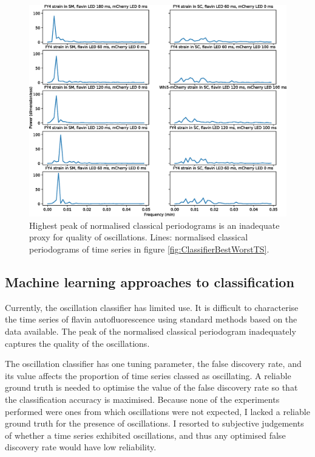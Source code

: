\begin{figure}[htbp]
  \centering
  \includegraphics[width=\textwidth]{10m_ClassifierBestWorstPS}
  \caption{Highest peak of normalised classical periodograms is an inadequate proxy for quality of oscillations.
    Lines: normalised classical periodograms of time series in figure \ref{fig:ClassifierBestWorstTS}.}
  \label{fig:ClassifierBestWorstPS}
\end{figure}


\subsection{Machine learning approaches to classification}
\label{subsec:analysis-classification-ml}

Currently, the oscillation classifier has limited use.
It is difficult to characterise the time series of flavin autofluorescence using standard methods based on the data available.
The peak of the normalised classical periodogram inadequately captures the quality of the oscillations.

The oscillation classifier has one tuning parameter, the false discovery rate, and its value affects the proportion of time series classed as oscillating.
A reliable ground truth is needed to optimise the value of the false discovery rate so that the classification accuracy is maximised.
Because none of the experiments performed were ones from which oscillations were not expected, I lacked a reliable ground truth for the presence of oscillations.
I resorted to subjective judgements of whether a time series exhibited oscillations, and thus any optimised false discovery rate would have low reliability.

